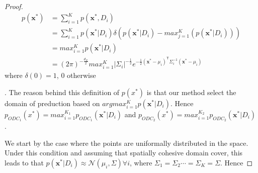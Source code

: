 \begin{proof}
\begin{equation}
\begin{split}
p(\textbf{x}^*) &  = \sum_{i=1}^{K}   p(\textbf{x}^*,D_i) \\ & = \sum_{i=1}^{K}   p(\textbf{x}^*|D_i) \delta ( p(\textbf{x}^*|D_i) -  max_{j=1}^K (p(\textbf{x}^*|D_i))) \\
  & =   max_{i=1}^{K} p(\textbf{x}^*|D_i) 
\\ 
& = (2 \pi)^{-\frac{d_X}{2}} max_{i=1}^{K}  |\Sigma_i|^{-\frac{1}{2}} e^{-\frac{1}{2} (\textbf{x}^*-\mu_i)^\mathsf{T} \Sigma_i^{-1}
 (\textbf{x}^*-\mu_i)}
\end{split}
\end{equation}
where $\delta(0)=1$, $0$ otherwise.  The reason behind this definition of  $p(x^*)$ is that our method select the domain of preduction based on $arg max_{i=1}^{K} p(\textbf{x}^*|D_i)$.  
Hence $p_{ODC_1}(x^*) = max_{i=1}^{K_1} p_{ODC_1}(\textbf{x}^*|D_i)$ and $p_{ODC_2}(x^*) = max_{i=1}^{K_2} p_{ODC_2}(\textbf{x}^*|D_i)$. 

We start by the case where the points are uniformally distributed in the space. Under this condition  and assuming that spatially cohesive domain cover, this leads to that $p(\textbf{x}^*|D_i) \approx  \mathcal{N}(\mu_i, \Sigma) \forall i$, where $\Sigma_1 = \Sigma_2 \cdots =\Sigma_K = \Sigma$.  Hence 


\end{proof}
